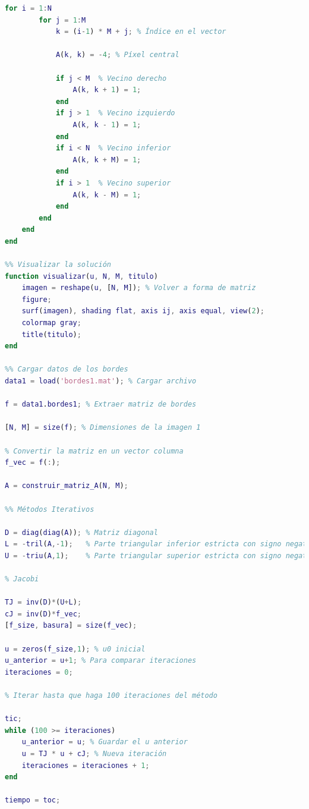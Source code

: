 \begin{homeworkProblem}
\begin{solucion}
\begin{enumerate}
\begin{lstlisting}[language = matlab]
    for i = 1:N
        for j = 1:M
            k = (i-1) * M + j; % Índice en el vector

            A(k, k) = -4; % Píxel central

            if j < M  % Vecino derecho
                A(k, k + 1) = 1;
            end
            if j > 1  % Vecino izquierdo
                A(k, k - 1) = 1;
            end
            if i < N  % Vecino inferior
                A(k, k + M) = 1;
            end
            if i > 1  % Vecino superior
                A(k, k - M) = 1;
            end
        end
    end
end

%% Visualizar la solución
function visualizar(u, N, M, titulo)
    imagen = reshape(u, [N, M]); % Volver a forma de matriz
    figure;
    surf(imagen), shading flat, axis ij, axis equal, view(2);
    colormap gray;
    title(titulo);
end

%% Cargar datos de los bordes
data1 = load('bordes1.mat'); % Cargar archivo

f = data1.bordes1; % Extraer matriz de bordes

[N, M] = size(f); % Dimensiones de la imagen 1

% Convertir la matriz en un vector columna
f_vec = f(:);

A = construir_matriz_A(N, M);

%% Métodos Iterativos

D = diag(diag(A)); % Matriz diagonal
L = -tril(A,-1);   % Parte triangular inferior estricta con signo negativo
U = -triu(A,1);    % Parte triangular superior estricta con signo negativo

% Jacobi

TJ = inv(D)*(U+L);
cJ = inv(D)*f_vec;
[f_size, basura] = size(f_vec);

u = zeros(f_size,1); % u0 inicial
u_anterior = u+1; % Para comparar iteraciones
iteraciones = 0;

% Iterar hasta que haga 100 iteraciones del método

tic;
while (100 >= iteraciones)
    u_anterior = u; % Guardar el u anterior
    u = TJ * u + cJ; % Nueva iteración
    iteraciones = iteraciones + 1;
end

tiempo = toc;


\end{lstlisting}
\end{enumerate}
\end{solucion}
\end{homeworkProblem}
